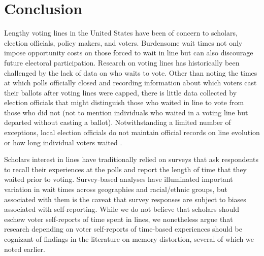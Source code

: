 \documentclass[12pt,titlepage]{article}
\begin{document}
\section*{Conclusion}




Lengthy voting lines in the United States have been of concern to
scholars, election officials, policy makers, and voters. Burdensome
wait times not only impose opportunity costs on those forced to wait
in line but can also discourage future electoral
participation. Research on voting lines has historically been
challenged by the lack of data on who waits to vote. Other than noting
the times at which polls officially closed and recording information
about which voters cast their ballots after voting lines were capped,
there is little data collected by election officials that might
distinguish those who waited in line to vote from those who did not
(not to mention individuals who waited in a voting line but departed
without casting a ballot).  Notwithstanding a limited number of
exceptions, local election officials do not maintain official records
on line evolution or how long individual voters waited
\citep{herron:confidence}.


Scholars interest in lines have traditionally relied on surveys that
ask respondents to recall their experiences at the polls and report
the length of time that they waited prior to voting. Survey-based
analyses have illuminated important variation in wait times across
geographies and racial/ethnic groups, but associated with them is the
caveat that survey responses are subject to biases associated with
self-reporting. While we do not believe that scholars should eschew
voter self-reports of time spent in lines, we nonetheless argue that
research depending on voter self-reports of time-based experiences
should be cognizant of findings in the literature on memory
distortion, several of which we noted earlier.
\end{document}
